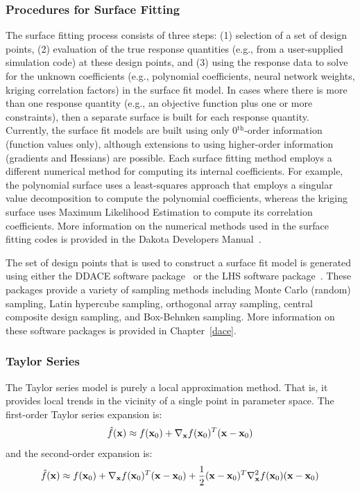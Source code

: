 \subsubsection{Procedures for Surface Fitting}\label{models:surf:procedures}

The surface fitting process consists of three steps: (1) selection of
a set of design points, (2) evaluation of the true response quantities
(e.g., from a user-supplied simulation code) at these design points,
and (3) using the response data to solve for the unknown coefficients
(e.g., polynomial coefficients, neural network weights, kriging
correlation factors) in the surface fit model. In cases where there is
more than one response quantity (e.g., an objective function plus one
or more constraints), then a separate surface is built for each
response quantity. Currently, the surface fit models are built using
only 0$^{\mathrm{th}}$-order information (function values only), although
extensions to using higher-order information (gradients and Hessians)
are possible. Each surface fitting method employs a different
numerical method for computing its internal coefficients. For example,
the polynomial surface uses a least-squares approach that employs a
singular value decomposition to compute the polynomial coefficients,
whereas the kriging surface uses Maximum Likelihood Estimation to
compute its correlation coefficients. More information on the
numerical methods used in the surface fitting codes is provided in the
Dakota Developers Manual~\cite{DevMan}.

The set of design points that is used to construct a surface fit model
is generated using either the DDACE software package~\cite{TonXX} or the
LHS software package~\cite{Ima84}. These packages provide a variety of
sampling methods including Monte Carlo (random) sampling, Latin
hypercube sampling, orthogonal array sampling, central composite
design sampling, and Box-Behnken sampling. More information on these
software packages is provided in Chapter~\ref{dace}.

\subsubsection{Taylor Series}\label{models:surf:taylor}

The Taylor series model is purely a local approximation method. That
is, it provides local trends in the vicinity of a single point in
parameter space. The first-order Taylor series expansion is:
\begin{equation}
\hat{f}({\bf x}) \approx f({\bf x}_0) + \nabla_{\bf x} f({\bf x}_0)^T 
({\bf x} - {\bf x}_0) \label{eq:taylor1}
\end{equation}
and the second-order expansion is:
\begin{equation}
\hat{f}({\bf x}) \approx f({\bf x}_0) + \nabla_{\bf x} f({\bf x}_0)^T 
({\bf x} - {\bf x}_0) + \frac{1}{2} ({\bf x} - {\bf x}_0)^T 
\nabla^2_{\bf x} f({\bf x}_0) ({\bf x} - {\bf x}_0) \label{eq:taylor2}
\end{equation}

